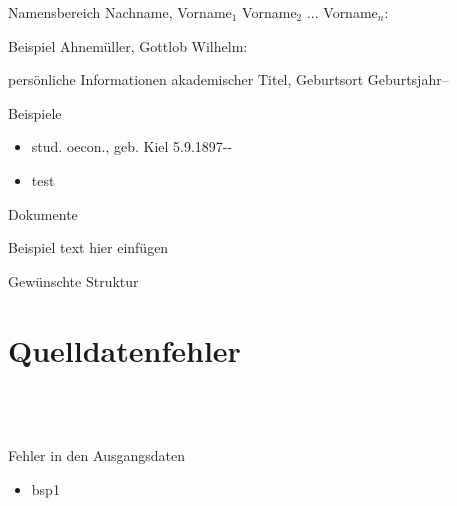 \documentclass[12pt]{beamer}
\begin{document}
\begin{large}
\begin{frame}{Namensbereich}
 Nachname, Vorname$_1$ Vorname$_2$ ... Vorname$_n$:

 \vspace*{\fill}
 \begin{block}{Beispiel}
 \normalsize Ahnemüller, Gottlob Wilhelm:
 \end{block}
\end{frame}


\begin{frame}{persönliche Informationen}
 akademischer Titel, Geburtsort Geburtsjahr--

 \vspace*{\fill}
 \begin{block}{Beispiele}
  \normalsize
  \begin{itemize}
   \item stud. oecon., geb. Kiel 5.9.1897-{}-
   \item test
  \end{itemize}
 \end{block}
\end{frame}


\begin{frame}{Dokumente}



 \vspace*{\fill}
 \begin{block}{Beispiel}
 \normalsize text hier einfügen
 \end{block}
\end{frame}


\begin{frame}{Gewünschte Struktur}



\end{frame}


\section{Quelldatenfehler}
 \subsection*{~}
\begin{frame}{Fehler in den Ausgangsdaten}
 \begin{itemize}
  \item bsp1
  
 \end{itemize}
\end{frame}


\end{large}
\end{document}
